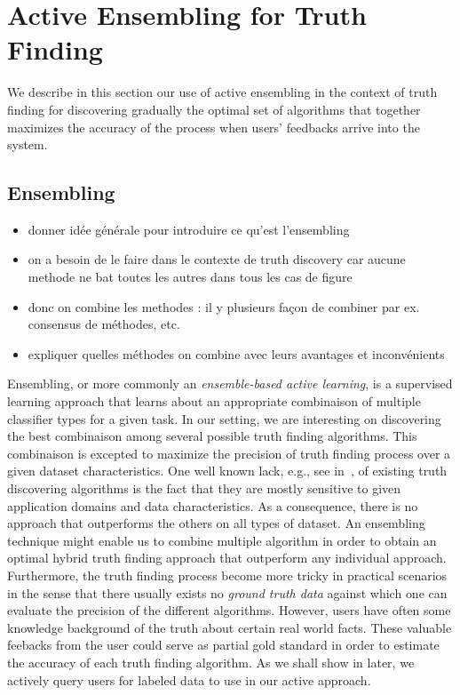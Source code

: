 \section{Active Ensembling for Truth Finding}
We describe in this section our use of active ensembling in the context of truth finding
for discovering gradually the optimal set of algorithms that together maximizes the accuracy
of the process when users' feedbacks arrive into the system.

\subsection{Ensembling }
\begin{itemize}
\item donner idée générale pour introduire  ce qu'est l'ensembling
\item on a besoin de le faire dans le contexte de truth discovery car aucune methode ne bat toutes les autres dans tous les cas de figure
\item donc on combine les methodes : il y plusieurs façon de combiner par ex. consensus de méthodes, etc.
\item expliquer quelles méthodes on combine avec leurs avantages et inconvénients
\end{itemize}


Ensembling, or more commonly an \emph{ensemble-based active learning}, is a supervised learning approach that learns
about an appropriate combinaison of multiple classifier types for a given task. In our setting, we are interesting
on discovering the best combinaison among several possible truth finding algorithms. This combinaison is excepted 
to maximize the precision of truth finding process over a given dataset characteristics.
One well known lack, e.g., see in~\cite{Li12, Wagui14}, of existing truth discovering algorithms is the fact that
they are mostly sensitive to given application domains and data characteristics. As a consequence, there is no approach 
that outperforms the others on all types of dataset.  An ensembling technique might enable  us to combine multiple algorithm
in order to obtain an optimal hybrid truth finding approach that outperform any individual approach. Furthermore, the truth
finding process become more tricky in practical scenarios in the sense that there usually exists no \emph{ground truth data}
against which one can evaluate the precision of the different algorithms. However, users have often some knowledge background
of the truth about certain real world facts. These valuable feebacks from the user could serve as partial gold standard in order
to estimate the accuracy of each truth finding algorithm.  As we shall show in later, we actively query users for labeled data to 
use in our active approach.


